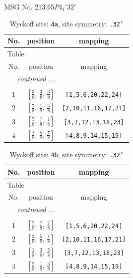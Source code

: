 \documentclass[fleqn,8pt]{jsarticle}
\begin{document}
\setcounter{MaxMatrixCols}{32}

\renewcommand{\tablename}{Table~}
\renewcommand{\figurename}{Figure~}
\begin{center}
\LARGE
MSG No. 213.65\quad$P4_{1}'32'$
\end{center}
\renewcommand{\arraystretch}{1.2}
\begin{longtable}{ccc}
\caption{Wyckoff site: {\tt 4a}, site symmetry: {\tt .32'}}
 \\
 \hline \hline
No. & position & mapping \\ \hline \endfirsthead

\multicolumn{2}{l}{\tablename\ \thetable{}} \\
 \hline \hline
No. & position & mapping \\ \hline \endhead

 \hline \hline
\multicolumn{2}{r}{\footnotesize\it continued ...} \\ \endfoot

 \hline \hline
\multicolumn{2}{r}{} \\ \endlastfoot

1 & $\left[ \frac{3}{8},\, \frac{3}{8},\, \frac{3}{8} \right]$ & {\tt [1,5,6,20,22,24]} \\ \hline
2 & $\left[ \frac{7}{8},\, \frac{1}{8},\, \frac{5}{8} \right]$ & {\tt [2,10,11,16,17,21]} \\ \hline
3 & $\left[ \frac{5}{8},\, \frac{7}{8},\, \frac{1}{8} \right]$ & {\tt [3,7,12,13,18,23]} \\ \hline
4 & $\left[ \frac{1}{8},\, \frac{5}{8},\, \frac{7}{8} \right]$ & {\tt [4,8,9,14,15,19]} \\
\end{longtable}
\renewcommand{\arraystretch}{1.2}
\begin{longtable}{ccc}
\caption{Wyckoff site: {\tt 4b}, site symmetry: {\tt .32'}}
 \\
 \hline \hline
No. & position & mapping \\ \hline \endfirsthead

\multicolumn{2}{l}{\tablename\ \thetable{}} \\
 \hline \hline
No. & position & mapping \\ \hline \endhead

 \hline \hline
\multicolumn{2}{r}{\footnotesize\it continued ...} \\ \endfoot

 \hline \hline
\multicolumn{2}{r}{} \\ \endlastfoot

1 & $\left[ \frac{7}{8},\, \frac{7}{8},\, \frac{7}{8} \right]$ & {\tt [1,5,6,20,22,24]} \\ \hline
2 & $\left[ \frac{3}{8},\, \frac{5}{8},\, \frac{1}{8} \right]$ & {\tt [2,10,11,16,17,21]} \\ \hline
3 & $\left[ \frac{1}{8},\, \frac{3}{8},\, \frac{5}{8} \right]$ & {\tt [3,7,12,13,18,23]} \\ \hline
4 & $\left[ \frac{5}{8},\, \frac{1}{8},\, \frac{3}{8} \right]$ & {\tt [4,8,9,14,15,19]} \\
\end{longtable}
\end{document}

